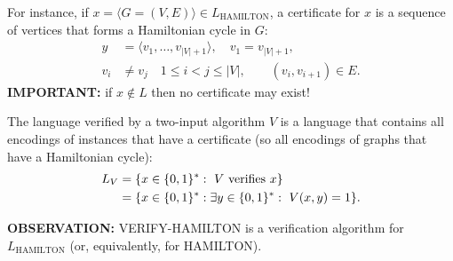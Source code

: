 For instance, if $x=\langle G=(V,E)\rangle\in L_{\mathrm{HAMILTON}}$, a certificate for $x$ is a sequence of vertices that forms a Hamiltonian cycle in $G$:
\[
\begin{aligned}
y&=\langle v_1,\ldots,v_{|V|+1}\rangle,\quad v_1=v_{|V|+1},\\
v_i&\neq v_j\quad1\leq i<j\leq|V|,\qquad(v_i,v_{i+1})\in E.
\end{aligned}
\]
\textbf{IMPORTANT:} if $x\notin L$ then no certificate may exist!

\begin{notesdefinition}
The language verified by a two-input algorithm $V$ is a language that contains all encodings of instances that have a certificate (so all encodings of graphs that have a Hamiltonian cycle):
\[
\begin{aligned}
L_V&=\{x\in\{0,1\}^*:\ V\text{ verifies }x\}\\
&=\{x\in\{0,1\}^*:\exists y\in\{0,1\}^*:\ V(x,y)=1\}.
\end{aligned}
\]
\end{notesdefinition}

\textbf{OBSERVATION:} VERIFY-HAMILTON is a verification algorithm for $L_{\mathrm{HAMILTON}}$ (or, equivalently, for HAMILTON).
